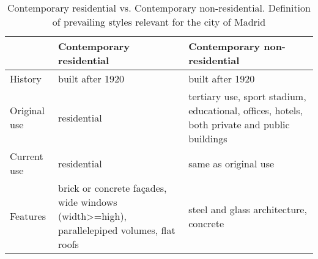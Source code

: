   \begin{table}[t]
     \centering
     {%
      \tiny
     \begin{tabular}{m{1.5cm}|m{4.9cm}|m{4.9cm}} %
            & {\bf Contemporary residential } & {\bf Contemporary non-residential} \\
            \hline\hline
           History       &  built after 1920 & built after 1920 \\
        Original use       & residential & tertiary use, sport stadium, educational, offices, hotels, both private and public buildings\\
        Current use       &residential & same as original use \\
        Features & brick or concrete façades, wide windows (width>=high), parallelepiped volumes, flat roofs  &  steel and glass architecture, concrete \\
     \end{tabular}
     }
     \vspace{1mm}
     \caption{Contemporary residential vs. Contemporary non-residential. Definition of prevailing styles relevant for the city of Madrid}
     \label{tab:residential_nonresidential}
  \end{table}